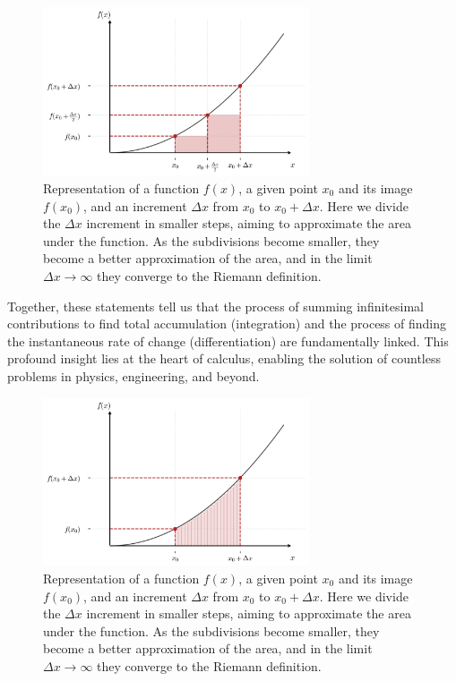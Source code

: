 \documentclass{book}
\begin{document}
\begin{figure}[ht]
    \centering
    \includegraphics[width=0.7\textwidth]{figures/appendix/integrals_2_subdivisions.png}
    \caption{Representation of a function $f(x)$, a given point $x_0$ and its image $f(x_0)$, and an increment $\Delta x$ from $x_0$ to $x_0 + \Delta x$. Here we divide the $\Delta x$ increment in smaller steps, aiming to approximate the area under the function. As the subdivisions become smaller, they become a better approximation of the area, and in the limit $\Delta x \rightarrow \infty$ they converge to the Riemann definition.}    \label{fig:integrals_2_subdivisions}
\end{figure}

Together, these statements tell us that the process of summing infinitesimal contributions to find total accumulation (integration) and the process of finding the instantaneous rate of change (differentiation) are fundamentally linked. This profound insight lies at the heart of calculus, enabling the solution of countless problems in physics, engineering, and beyond.

\begin{figure}[ht]
    \centering
    \includegraphics[width=0.7\textwidth]{figures/appendix/integrals_3_riemann.png}
    \caption{Representation of a function $f(x)$, a given point $x_0$ and its image $f(x_0)$, and an increment $\Delta x$ from $x_0$ to $x_0 + \Delta x$. Here we divide the $\Delta x$ increment in smaller steps, aiming to approximate the area under the function. As the subdivisions become smaller, they become a better approximation of the area, and in the limit $\Delta x \rightarrow \infty$ they converge to the Riemann definition.}
    \label{fig:integrals_3_riemann}
\end{figure}
\end{document}
